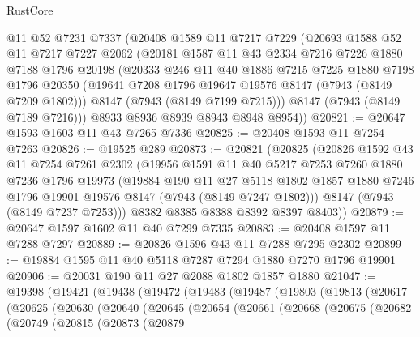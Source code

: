 \begin{lexlean}{RustCore}
\begin{coremodule}
    @11
    @52
    @7231
    @7337
    (@20408
      @1589
      @11
      @7217
      @7229
      (@20693
        @1588
        @52
        @11
        @7217
        @7227
        @2062
        (@20181
          @1587
          @11
          @43
          @2334
          @7216
          @7226
          @1880
          @7188
          @1796
          @20198
          (@20333
            @246
            @11
            @40
            @1886
            @7215
            @7225
            @1880
            @7198
            @1796
            @20350
            (@19641 @7208 @1796 @19647 @19576 @8147 (@7943 (@8149 @7209 @1802)))
            @8147
            (@7943 (@8149 @7199 @7215)))
          @8147
          (@7943 (@8149 @7189 @7216)))
        @8933
        @8936
        @8939
        @8943
        @8948
        @8954))
@20821 := @20647 @1593 @1603 @11 @43 @7265 @7336
@20825 := @20408 @1593 @11 @7254 @7263
@20826 := @19525 @289
@20873 := @20821
    (@20825
      (@20826
        @1592
        @43
        @11
        @7254
        @7261
        @2302
        (@19956
          @1591
          @11
          @40
          @5217
          @7253
          @7260
          @1880
          @7236
          @1796
          @19973
          (@19884
            @190
            @11
            @27
            @5118
            @1802
            @1857
            @1880
            @7246
            @1796
            @19901
            @19576
            @8147
            (@7943 (@8149 @7247 @1802)))
          @8147
          (@7943 (@8149 @7237 @7253)))
        @8382
        @8385
        @8388
        @8392
        @8397
        @8403))
@20879 := @20647 @1597 @1602 @11 @40 @7299 @7335
@20883 := @20408 @1597 @11 @7288 @7297
@20889 := @20826 @1596 @43 @11 @7288 @7295 @2302
@20899 := @19884 @1595 @11 @40 @5118 @7287 @7294 @1880 @7270 @1796 @19901
@20906 := @20031 @190 @11 @27 @2088 @1802 @1857 @1880
@21047 := @19398
    (@19421
      (@19438
        (@19472
          (@19483
            (@19487
              (@19803
                (@19813
                  (@20617
                    (@20625
                      (@20630
                        (@20640
                          (@20645
                            (@20654
                              (@20661
                                (@20668
                                  (@20675
                                    (@20682
                                      (@20749
                                        (@20815
                                          (@20873
                                            (@20879

\end{coremodule}
\end{lexlean}
